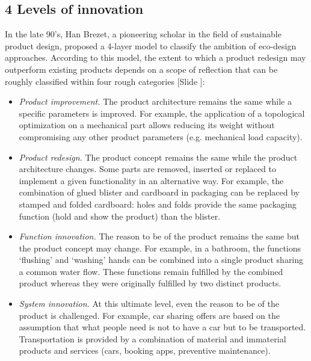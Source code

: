 \documentclass{article}
\newcounter{slide}
\begin{document}
\subsection{4 Levels of innovation}
\label{sec:fourlevels}
In the late 90's, Han Brezet, a pioneering scholar in the field of sustainable product design, proposed a 4-layer model to classify the ambition of eco-design approaches. According to this model, the extent to which a product redesign may outperform existing products depends on a scope of reflection that can be roughly classified within four rough categories {\color{blue}[Slide ]}\cite{bhamraEcodesignSearchNew2004, brezet1997dynamics}:
\begin{itemize}
	\item \emph{Product improvement.} The product architecture remains the same while a specific parameters is improved. For example, the application of a topological optimization on a mechanical part allows reducing its weight without compromising any other product parameters (e.g. mechanical load capacity).
	\item \emph{Product redesign.} The product concept remains the same while the product architecture changes. Some parts are removed, inserted or replaced to implement a given functionality in an alternative way. For example, the combination of glued blister and cardboard in packaging can be replaced by stamped and folded cardboard: holes and folds provide the same packaging function (hold and show the product) than the blister. 
	\item \emph{Function innovation.} The reason to be of the product remains the same but the product concept may change. For example, in a bathroom, the functions `flushing' and `washing' hands can be combined into a single product sharing a common water flow. These functions remain fulfilled by the combined product whereas they were originally fulfilled by two distinct products.
	\item \emph{System innovation.} At this ultimate level, even the reason to be of the product is challenged. For example, car sharing offers are based on the assumption that what people need is not to have a car but to be transported. Transportation is provided by a combination of material and immaterial products and services (cars, booking apps, preventive maintenance).
\end{itemize}
\end{document}
